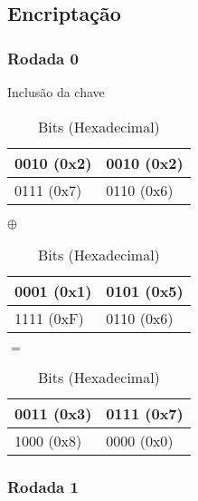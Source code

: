 \documentclass[
    article,            %
    11pt,               %
    oneside,            %
    a4paper,            %
    english,            %
    brazil,             %
    sumario=tradicional,
    ]{abntex2}
\begin{document}
\subsection{\textbf{Encriptação}}
\label{sub:encriptacao}

\subsubsection{\textbf{Rodada 0}}
\label{subsub:rodada0}

\label{subsubsub:include-key-round0}

\begin{table}[H]
\centering
\caption{Inclusão da chave}
\label{input-data-nibbles-round0}
\begin{tabular}{|l|l|}
\hline
0010 (0x2) & 0010 (0x2) \\ \hline
0111 (0x7)& 0110 (0x6)\\ \hline
\end{tabular}
$\oplus$
\begin{tabular}{|l|l|}
\hline
0001 (0x1) & 0101 (0x5) \\ \hline
1111 (0xF) & 0110 (0x6) \\ \hline
\end{tabular}
$=$
\begin{tabular}{|l|l|}
\hline
0011 (0x3) & 0111 (0x7)\\ \hline
1000 (0x8) & 0000 (0x0)\\ \hline
\end{tabular}
\caption*{Bits (Hexadecimal)}
\end{table}

\subsubsection{\textbf{Rodada 1}}
\label{subsub:rodada1}

\label{subsubsub:substituicao-nibble-round1}
\end{document}
